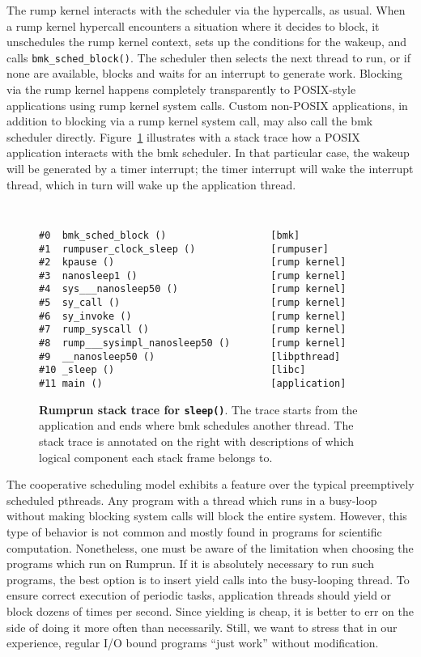 The rump kernel interacts with the scheduler via the hypercalls, as usual.
When a rump kernel hypercall encounters a situation where it decides to block,
it unschedules the rump kernel context, sets up the conditions for the
wakeup, and calls \verb+bmk_sched_block()+.  The scheduler then selects
the next thread to run, or if none are available, blocks and waits for
an interrupt to generate work.  Blocking via the rump kernel happens
completely transparently to POSIX-style applications using rump kernel
system calls.  Custom non-POSIX applications, in addition to blocking
via a rump kernel system call, may also call the bmk scheduler directly.
Figure~\ref{fig:bmkblock} illustrates with a stack trace how a POSIX
application interacts with the bmk scheduler.  In that particular case,
the wakeup will be generated by a timer interrupt; the timer interrupt
will wake the interrupt thread, which in turn will wake up the application
thread.

\begin{figure}[t]
{\tt \scriptsize
\begin{verbatim}
#0  bmk_sched_block ()                  [bmk]
#1  rumpuser_clock_sleep ()             [rumpuser]
#2  kpause ()                           [rump kernel]
#3  nanosleep1 ()                       [rump kernel]
#4  sys___nanosleep50 ()                [rump kernel]
#5  sy_call ()                          [rump kernel]
#6  sy_invoke ()                        [rump kernel]
#7  rump_syscall ()                     [rump kernel]
#8  rump___sysimpl_nanosleep50 ()       [rump kernel]
#9  __nanosleep50 ()                    [libpthread]
#10 _sleep ()                           [libc]
#11 main ()                             [application]
\end{verbatim}}
\caption[Rumprun stack trace for \texttt{sleep()}]
{\textbf{Rumprun stack trace for \texttt{sleep()}}.
The trace starts from the application and ends where bmk schedules
another thread.  The stack trace is annotated on the right with
descriptions of which logical component each stack frame belongs to.
}
\label{fig:bmkblock}
\end{figure}

The cooperative scheduling model exhibits a feature over the typical
preemptively scheduled pthreads.  Any program with a thread which runs
in a busy-loop without making blocking system calls will block the
entire system.  However, this type of behavior is not common and mostly
found in programs for scientific computation.  Nonetheless, one must be
aware of the limitation when choosing the programs which run on Rumprun.
If it is absolutely necessary to run such programs, the best option is
to insert yield calls into the busy-looping thread.  To ensure correct
execution of periodic tasks, application threads should yield or block
dozens of times per second.  Since yielding is cheap, it is better to
err on the side of doing it more often than necessarily.  Still, we want
to stress that in our experience, regular I/O bound programs ``just work''
without modification.


